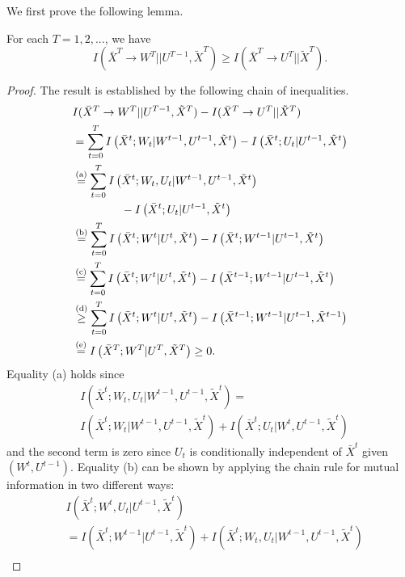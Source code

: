 
We first prove the following lemma.
\begin{lemma}
\label{lemcoding}
For each $T=1, 2, ...$, we have
\[
I(\bar{X}^{T} \rightarrow W^{T} || U^{T-1},\tilde{X}^{T}) \geq I(\bar{X}^{T} \rightarrow U^{T} || \tilde{X}^{T}).
\]
\end{lemma}
\begin{proof}
The result is established by the following chain of inequalities.
\begin{align*}
&  I(\bar{X}^T \rightarrow W^T || U^{T-1},\tilde{X}^T) - I(\bar{X}^T \rightarrow U^T || \tilde{X}^T)  \\
& = \sum_{t=0}^T I\left(\bar{X}^t;W_t|W^{t-1},U^{t-1},\tilde{X}^t \right) - I\left(\bar{X}^t;U_t|U^{t-1},\tilde{X}^t \right)\\
& \stackrel{\text{(a)}}{=} \sum_{t=0}^T I\left(\bar{X}^t;W_t,U_t|W^{t-1},U^{t-1},\tilde{X}^t \right) \\
& \hspace{10ex}- I\left(\bar{X}^t;U_t|U^{t-1},\tilde{X}^t \right)\\
& \stackrel{\text{(b)}}{=} \sum_{t=0}^T I\left(\bar{X}^t;W^t|U^{t},\tilde{X}^t \right) - I\left(\bar{X}^t;W^{t-1}|U^{t-1},\tilde{X}^t \right)\\
& \stackrel{\text{(c)}}{=} \sum_{t=0}^T I\left(\bar{X}^t;W^t|U^{t},\tilde{X}^t \right) - I\left(\bar{X}^{t-1};W^{t-1}|U^{t-1},\tilde{X}^t \right)\\
& \stackrel{\text{(d)}}{\geq} \sum_{t=0}^T I\left(\bar{X}^t;W^t|U^{t},\tilde{X}^t \right) - I\left(\bar{X}^{t-1};W^{t-1}|U^{t-1},\tilde{X}^{t-1} \right)\\
& \stackrel{\text{(e)}}{=} I\left(\bar{X}^T;W^T | U^T,\tilde{X}^T \right) \geq 0. 
\end{align*}
Equality (a) holds since
\begin{align*}
&I(\bar{X}^t; W_t, U_t|W^{t-1}, U^{t-1}, \tilde{X}^t)=\\
&I(\bar{X}^t; W_t|W^{t-1}, U^{t-1}, \tilde{X}^t)
+I(\bar{X}^t; U_t|W^t, U^{t-1}, \tilde{X}^t)
\end{align*}
and the second term is zero since $U_t$ is conditionally independent of $\bar{X}^t$ given $(W^t, U^{t-1})$. Equality (b) can be shown by applying the chain rule for mutual information in two different ways:
\begin{align*}
&I(\bar{X}^t; W^t, U_t|U^{t-1}, \tilde{X}^t) \\
&=I(\bar{X}^t; W^{t-1}|U^{t-1}, \tilde{X}^t)+I(\bar{X}^t; W_t, U_t| W^{t-1}, U^{t-1}, \tilde{X}^t) \\

\end{align*}
\end{proof}
